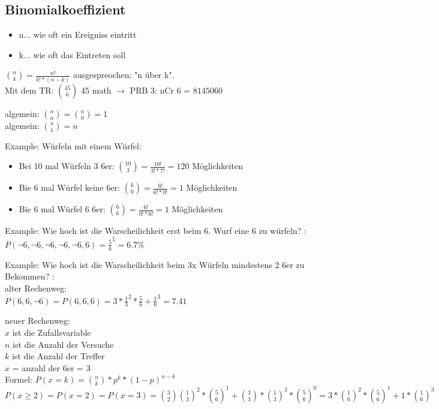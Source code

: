 \subsection{Binomialkoeffizient}

\hfill \break
\begin{itemize}
    \item n... wie oft ein Ereigniss eintritt
    \item k... wie oft das Eintreten soll
\end{itemize}

\hfill \break
$\binom{n}{k} = \frac{n!}{k!*(n-k)}$ ausgespreochen: "n über k".\\

\hfill \break
Mit dem TR: $\binom{45}{6}$ 45 math $\rightarrow$ PRB 3: nCr 6 = $8145060$

\hfill \break
algemein: $\binom{n}{n} = \binom{n}{0} = 1$\\
algemein: $\binom{n}{1} = n$

\hfill \break
Example: Würfeln mit einem Würfel:\\
\begin{itemize}
    \item Bei 10 mal Würfeln 3 6er: $\binom{10}{3} = \frac{10!}{3!*7!} = 120$ Möglichkeiten
    \item Bie 6 mal Würfel keine 6er: $\binom{6}{0} = \frac{6!}{6!*0!} = 1$ Möglichkeiten
    \item Bie 6 mal Würfel 6 6er: $\binom{6}{6} = \frac{6!}{0!*6!} = 1$ Möglichkeiten
\end{itemize}

\hfill \break
Example: Wie hoch ist die Warscheilichkeit erst beim 6. Wurf eine 6 zu würfeln? :\\
$P(\lnot6,\lnot6,\lnot6,\lnot6,\lnot6,6) = \frac{5}{6}^5 = 6.7\%$

\hfill \break
Example: Wie hoch ist die Warscheilichkeit beim 3x Würfeln mindestens 2 6er zu Bekommen? :\\

\hfill \break
alter Rechenweg:\\
$P(6,6,\lnot6) = P(6,6,6) = 3*\frac{1}{3}^2*\frac{5}{6}+\frac{1}{6}^3 = 7.41$

\hfill \break
neuer Rechenweg:\\
$x$ ist die Zufallsvariable\\
$n$ ist die Anzahl der Versuche\\
$k$ ist die Anzahl der Treffer\\
$x$ = anzahl der 6er = 3\\
Formel: $P(x=k) = \binom{n}{k}*p^k*(1-p)^{n-k}$\\

$P(x\geq 2) = P(x=2) = P(x=3) = \binom{3}{2} \binom{1}{3}^2*\binom{5}{6}^1+\binom{3}{3}*\binom{1}{3}^3*\binom{5}{6}^0 = 3*\binom{1}{6}^2*\binom{5}{6}^1+1*\binom{1}{6}^3$\\


